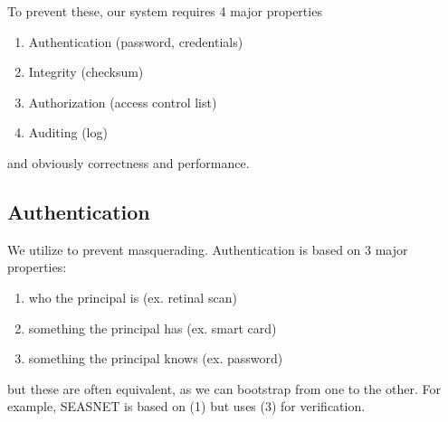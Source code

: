 \documentclass[../../lecture_notes.tex]{subfiles}
\begin{document}
To prevent these, our system requires 4 major properties
\begin{enumerate}[nosep]
\item Authentication (password, credentials)
\item Integrity (checksum)
\item Authorization (access control list)
\item Auditing (log)
\end{enumerate}
and obviously correctness and performance.


\subsection{Authentication}

We utilize  to prevent masquerading. Authentication is based on 3 major properties:
\begin{enumerate}[nosep]
\item who the principal is (ex. retinal scan)
\item something the principal has (ex. smart card)
\item something the principal knows (ex. password)
\end{enumerate}
but these are often equivalent, as we can bootstrap from one to the other. For example, SEASNET is based on (1) but uses (3) for verification.
\end{document}
